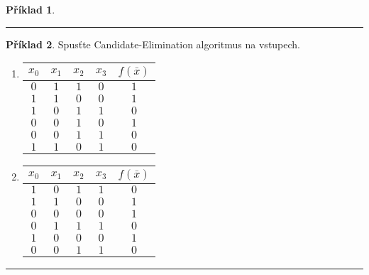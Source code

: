 \documentclass[a4paper]{article}
\theoremstyle{definition}
\newtheorem{priklad}{Příklad}
\begin{document}
\begin{priklad}
\noindent\rule{\linewidth}{.2pt}    
\end{priklad}

\begin{priklad}
    Spusťte Candidate-Elimination algoritmus na vstupech.
    
    \begin{enumerate}
      \item 
          \begin{tabular}{*{4}{c}|c}
          \hline
           $ x_0 $ & $ x_1 $ & $ x_2 $ & $ x_3 $ & $ f(\bar{x}) $ \\
           \hline
           $ 0 $ & $ 1 $ & $ 1 $ & $ 0 $ & $ 1 $ \\
           $ 1 $ & $ 1 $ & $ 0 $ & $ 0 $ & $ 1 $ \\
           $ 1 $ & $ 0 $ & $ 1 $ & $ 1 $ & $ 0 $ \\
           $ 0 $ & $ 0 $ & $ 1 $ & $ 0 $ & $ 1 $ \\
           $ 0 $ & $ 0 $ & $ 1 $ & $ 1 $ & $ 0 $ \\
           $ 1 $ & $ 1 $ & $ 0 $ & $ 1 $ & $ 0 $ \\
           \hline
          \end{tabular}
      \item 
          \begin{tabular}{*{4}{c}|c}
          \hline
           $ x_0 $ & $ x_1 $ & $ x_2 $ & $ x_3 $ & $ f(\bar{x}) $ \\
           \hline
           $ 1 $ & $ 0 $ & $ 1 $ & $ 1 $ & $ 0 $ \\
           $ 1 $ & $ 1 $ & $ 0 $ & $ 0 $ & $ 1 $ \\
           $ 0 $ & $ 0 $ & $ 0 $ & $ 0 $ & $ 1 $ \\
           $ 0 $ & $ 1 $ & $ 1 $ & $ 1 $ & $ 0 $ \\
           $ 1 $ & $ 0 $ & $ 0 $ & $ 0 $ & $ 1 $ \\
           $ 0 $ & $ 0 $ & $ 1 $ & $ 1 $ & $ 0 $ \\
           \hline
          \end{tabular}
    \end{enumerate}    
\noindent\rule{\linewidth}{.2pt}    
\end{priklad}

\newpage
\end{document}
